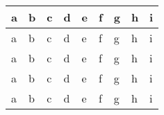 \begin{table}[]
\begin{tabular}{|l|l|l|llllll|}
a                     & b                       & c                      & \multicolumn{1}{l|}{d}          & \multicolumn{1}{l|}{e}     & \multicolumn{1}{l|}{f}                       & \multicolumn{1}{l|}{g}        & \multicolumn{1}{l|}{h}        & i              \\ \hline
a                     & b                       & c                      & \multicolumn{1}{l|}{d}          & \multicolumn{1}{l|}{e}     & \multicolumn{1}{l|}{f}                       & \multicolumn{1}{l|}{g}        & \multicolumn{1}{l|}{h}        & i              \\ \hline
a                     & b                       & c                      & \multicolumn{1}{l|}{d}          & \multicolumn{1}{l|}{e}     & \multicolumn{1}{l|}{f}                       & \multicolumn{1}{l|}{g}        & \multicolumn{1}{l|}{h}        & i              \\ \hline
a                     & b                       & c                      & \multicolumn{1}{l|}{d}          & \multicolumn{1}{l|}{e}     & \multicolumn{1}{l|}{f}                       & \multicolumn{1}{l|}{g}        & \multicolumn{1}{l|}{h}        & i              \\ \hline
a                     & b                       & c                      & \multicolumn{1}{l|}{d}          & \multicolumn{1}{l|}{e}     & \multicolumn{1}{l|}{f}                       & \multicolumn{1}{l|}{g}        & \multicolumn{1}{l|}{h}        & i              \\ \hline
\end{tabular}
\end{table}